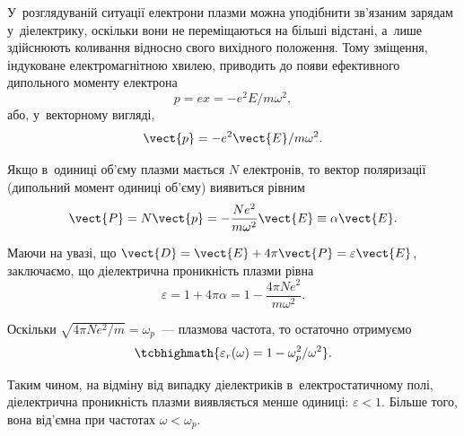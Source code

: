 У~розглядуваній ситуації електрони плазми можна уподібнити зв'язаним зарядам у~діелектрику, оскільки вони не переміщаються на більші відстані, а~лише здійснюють коливання відносно свого вихідного положення. Тому зміщення, індуковане електромагнітною хвилею, приводить до появи ефективного дипольного моменту електрона
\begin{equation*}
	p = ex = -e^2E/m\omega^2,
\end{equation*}
або, у~векторному вигляді,
\begin{equation*}
	\vect{p} = -e^2\vect{E}/m\omega^2.
\end{equation*}

Якщо в~одиниці об'єму плазми мається $N$ електронів, то вектор поляризації (дипольний момент одиниці об'єму) виявиться рівним
\begin{equation*}
	\vect{P} = N\vect{p} = -\frac{Ne^2}{m\omega^2}\vect{E} \equiv \alpha\vect{E}.
\end{equation*}

Маючи на увазі, що $\vect{D} = \vect{E} + 4\pi\vect{P} = \varepsilon\vect{E}$, заключаємо, що діелектрична проникність плазми рівна
\begin{equation}\label{eq:plasma-permittivity}
	\varepsilon = 1 + 4\pi\alpha = 1 - \frac{4\pi Ne^2}{m\omega^2}.
\end{equation}

Оскільки $\sqrt{4\pi Ne^2/m} = \omega_p$~--- плазмова частота, то остаточно отримуємо
\begin{equation}\label{eq:plasma-permittivity-final}
	\tcbhighmath{\varepsilon_r(\omega) = 1 - \omega_p^2/\omega^2}.
\end{equation}

Таким чином, на відміну від випадку діелектриків в~електростатичному полі, діелектрична проникність плазми виявляється менше одиниці: $\varepsilon < 1$. Більше того, вона від'ємна при частотах $\omega < \omega_p$.

